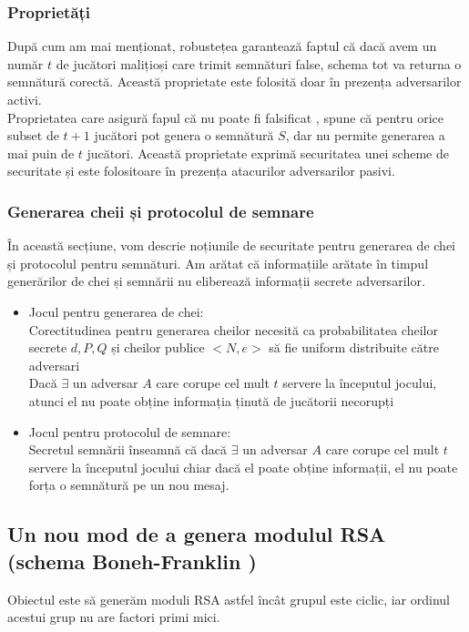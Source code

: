 \documentclass[12]{report}
\begin{document}
\subsubsection{Proprietăți}
După cum am mai menționat, robustețea garantează faptul că dacă avem un număr $t$ de jucători malițioși care trimit semnături false, schema tot va returna o semnătură corectă. Această proprietate este folosită doar în prezența adversarilor activi.\\
Proprietatea care asigură fapul că nu poate fi falsificat , spune că pentru orice subset de $t+1$ jucători pot genera o semnătură $S$, dar nu permite generarea a mai puin de $t$ jucători. Această proprietate exprimă securitatea unei scheme de securitate și este folositoare în prezența atacurilor adversarilor pasivi.
\subsubsection{Generarea cheii și protocolul de semnare}
În această secțiune, vom descrie noțiunile de securitate pentru generarea de chei și protocolul pentru semnături. Am arătat că informațiile arătate în timpul generărilor de chei și semnării nu eliberează informații secrete adversarilor.
\begin{itemize}
\item Jocul pentru generarea de chei: \\
Corectitudinea pentru generarea cheilor necesită ca probabilitatea cheilor secrete $d, P, Q$ și cheilor publice $<N,e>$ să fie uniform distribuite către adversari \\ 
Dacă $\exists$ un adversar $A$ care corupe cel mult $t$ servere la începutul jocului, atunci el nu poate obține informația ținută de jucătorii necorupți

\item Jocul pentru protocolul de semnare: \\
Secretul semnării înseamnă că dacă $\exists$ un adversar $A$ care corupe cel mult $t$ servere la începutul jocului chiar dacă el poate obține informații, el nu poate forța o semnătură pe un nou mesaj.
\end{itemize}


\subsection{Un nou mod de a genera modulul RSA (schema Boneh-Franklin \cite{boneh})}
Obiectul este să generăm moduli RSA astfel încât grupul este ciclic, iar ordinul acestui grup nu are factori primi mici.
\end{document}
